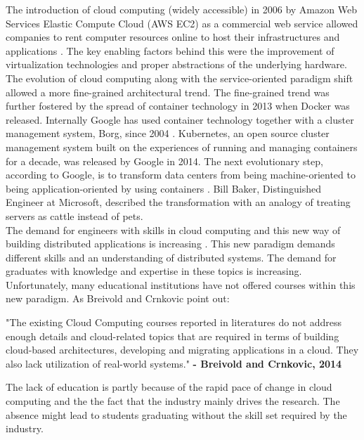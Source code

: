 \noindent
The introduction of cloud computing (widely accessible) in 2006 by Amazon Web Services Elastic Compute Cloud  (AWS EC2) as a commercial web service allowed companies to rent computer resources online to host their infrastructures and applications \cite{history_of_cloud_computing}. The key enabling factors behind this were the improvement of virtualization technologies and proper abstractions of the underlying hardware. The evolution of cloud computing along with the service-oriented paradigm shift allowed a more fine-grained architectural trend. The fine-grained trend was further fostered by the spread of container technology in 2013 when Docker was released. Internally Google has used container technology together with a cluster management system, Borg, since 2004 \cite[p. 1]{verma2015borg}. Kubernetes, an open source cluster management system built on the experiences of running and managing containers for a decade, was released by Google in 2014. The next evolutionary step, according to Google, is to transform data centers from being machine-oriented to being application-oriented by using containers \cite[p. 5]{burns2016borg_omega_kubernetes}. Bill Baker, Distinguished Engineer at Microsoft, described the transformation with an analogy of treating servers as cattle instead of pets. \\


\noindent
The demand for engineers with skills in cloud computing and this new way of building distributed applications is increasing \cite{newyorktimesclouddemand}. This new paradigm demands different skills and an understanding of distributed systems. The demand for graduates with knowledge and expertise in these topics is increasing. Unfortunately, many educational institutions have not offered courses within this new paradigm. As Breivold and Crnkovic point out:

\begin{citat} []
"The existing Cloud Computing courses reported in literatures do not address enough details and cloud-related topics that are required in terms of building cloud-based architectures, developing and migrating applications in a cloud. They also lack utilization of real-world systems." \textbf{- Breivold and Crnkovic, 2014} \cite[p. 36]{breivold2014education_strategies}
\end{citat}


\noindent
The lack of education is partly because of the rapid pace of change in cloud computing and the the fact that the industry mainly drives the research. The absence might lead to students graduating without the skill set required by the industry.  \\

